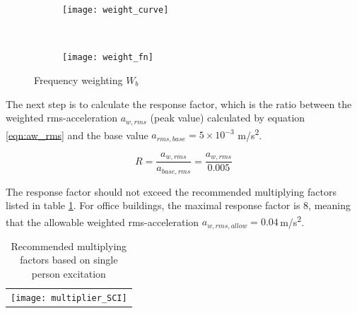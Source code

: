 \begin{figure}[H]
\begin{subfigure}[H]{.48\textwidth}
  \centering
  \texttt{[image: weight\_curve]}
\end{subfigure}
~
\begin{subfigure}[H]{.5\textwidth}
  \centering
  \texttt{[image: weight\_fn]}
\end{subfigure}

\caption{Frequency weighting $W_b$}
\label{fig:Wb}
\end{figure}

The next step is to calculate the response factor, which is the ratio between the weighted rms-acceleration $a_{w,rms}$ (peak value) calculated by equation \ref{eqn:aw_rms} and the base value $a_{rms,base}=5\times10^{-3}$ m/s\textsuperscript{2}.

\begin{equation}
    R=\frac{a_{w,rms}}{a_{base,rms}}=\frac{a_{w,rms}}{0.005}
\end{equation}

The response factor should not exceed the recommended multiplying factors listed in table \ref{table:multiplier_SCI}. For office buildings, the maximal response factor is 8, meaning that the allowable weighted rms-acceleration $a_{w,rms,allow}=0.04$\,m/s\textsuperscript{2}.
\begin{table}[H]
\centering
\caption{Recommended multiplying factors based on single person excitation}
\label{table:multiplier_SCI}
\begin{tabular}{c}
\texttt{[image: multiplier\_SCI]}
\end{tabular}
\end{table}